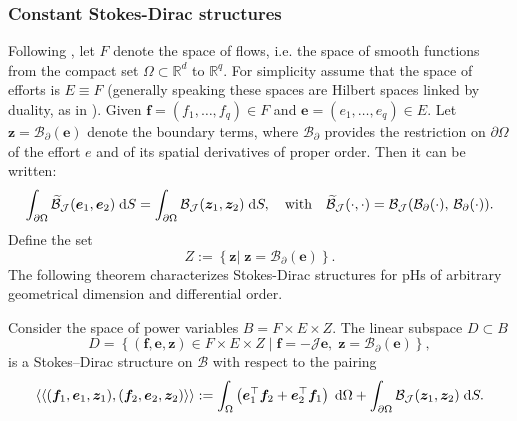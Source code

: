 \subsubsection{Constant Stokes-Dirac structures}
Following \cite{macchelli2005modelling}, let ${F}$ denote the space of flows, i.e. the space of smooth functions from the compact set $\Omega \subset \mathbb{R}^d$ to $\mathbb{R}^q$. For simplicity assume that  the space of efforts is ${E} \equiv {F}$ (generally speaking these spaces are Hilbert spaces linked by duality, as in \cite{villegas2007}). Given $\bm{f} = (f_1, \dots, f_q) \in {F}$ and $\bm{e} = (e_1, \dots, e_q) \in {E}$. Let $\bm{z} = \mathcal{B}_\partial(\bm{e})$ denote the boundary terms, where $\mathcal{B}_\partial$ provides the restriction on $\partial\Omega$ of the effort $e$ and of its spatial derivatives of proper order. Then it can be written:
\begin{equation}
\int_{\partial \Omega} \widetilde{\mathcal{B}}_{\mathcal{J}}(\bm{e}_1, \bm{e}_2) \d{S} = \int_{\partial \Omega} \mathcal{B}_{\mathcal{J}}(\bm{z}_1, \bm{z}_2) \d{S}, \quad \text{with} \quad  \widetilde{\mathcal{B}}_\mathcal{J}(\cdot, \cdot) = \mathcal{B}_{\mathcal{J}}(\mathcal{B}_{\partial}(\cdot), \, \mathcal{B}_{\partial}(\cdot)).
\end{equation}
Define the set
\begin{equation}
{Z} := \left\{ \bm{z} \vert \; \bm{z} = \mathcal{B}_{\partial}(\bm{e})  \right\}.
\end{equation}
The following theorem characterizes Stokes-Dirac structures for pHs of arbitrary geometrical dimension and differential order.
\begin{theorem}
	\label{th:StokesDirac}
	Consider the space of power variables ${B} = {F} \times {E} \times {Z}$. The linear subspace ${D} \subset {B}$
	\begin{equation}
	{D} = \left\{ (\bm{f}, \bm{e}, \bm{z}) \in  {F} \times {E} \times {Z} \; \vert \; \bm{f} = -\mathcal{J} \bm{e}, \; \bm{z} = \mathcal{B}_\partial(\bm{e}) \right\},
	\end{equation}
	is a Stokes–Dirac structure on $\mathcal{B}$ with respect to the pairing
	\begin{equation}
	\left\langle \left\langle (\bm{f}_1, \bm{e}_1, \bm{z}_1), (\bm{f}_2, \bm{e}_2, \bm{z}_2) \right\rangle \right\rangle  := \int_{\Omega} \left( \bm{e}_1^\top \bm{f}_2 + \bm{e}_2^\top \bm{f}_1 \right) \d\Omega + \int_{\partial \Omega} \mathcal{B}_{\mathcal{J}}(\bm{z}_1, \bm{z}_2) \d{S}.
	\end{equation}
\end{theorem}
